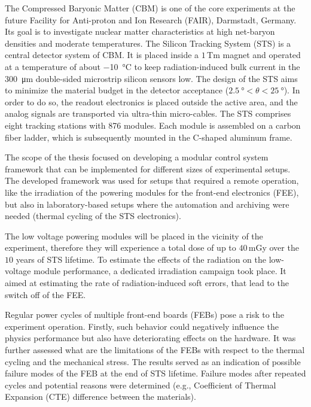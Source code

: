 The Compressed Baryonic Matter (CBM) is one of the core experiments at the future Facility for Anti-proton and Ion Research (FAIR), Darmstadt, Germany. Its goal is to investigate nuclear matter characteristics at high net-baryon densities and moderate temperatures. The Silicon Tracking System (STS) is a central detector system of CBM. It is placed inside a $1$\,Tm magnet and operated at a temperature of about \SI{-10}{\celsius} to keep radiation-induced bulk current in the \SI{300}{\micro\metre} double-sided microstrip silicon sensors low. The design of the STS aims to minimize the material budget in the detector acceptance ($\SI{2.5}{\degree} < \theta < \SI{25}{\degree}$). In order to do so, the readout electronics is placed outside the active area, and the analog signals are transported via ultra-thin micro-cables. The STS comprises eight tracking stations with 876 modules. Each module is assembled on a carbon fiber ladder, which is subsequently mounted in the C-shaped aluminum frame. 

The scope of the thesis focused on developing a modular control system framework that can be implemented for different sizes of experimental setups. The developed framework was used for setups that required a remote operation, like the irradiation of the powering modules for the front-end electronics (\gls{FEE}), but also in laboratory-based setups where the automation and archiving were needed (thermal cycling of the \gls{STS} electronics).

The low voltage powering modules will be placed in the vicinity of the experiment, therefore they will experience a total dose of up to $40$\,mGy over the $10$ years of \gls{STS} lifetime. To estimate the effects of the radiation on the low-voltage module performance, a dedicated irradiation campaign took place. It aimed at estimating the rate of radiation-induced soft errors, that lead to the switch off of the \gls{FEE}.

Regular power cycles of multiple front-end boards (\glspl{FEB}) pose a risk to the experiment operation.  Firstly, such behavior could negatively influence the physics performance but also have deteriorating effects on the hardware. It was further assessed what are the limitations of the \glspl{FEB} with respect to the thermal cycling and the mechanical stress. The results served as an indication of possible failure modes of the \gls{FEB} at the end of \gls{STS} lifetime. Failure modes after repeated cycles and potential reasons were determined (e.g., Coefficient of Thermal Expansion (\gls{CTE}) difference between the materials). 

